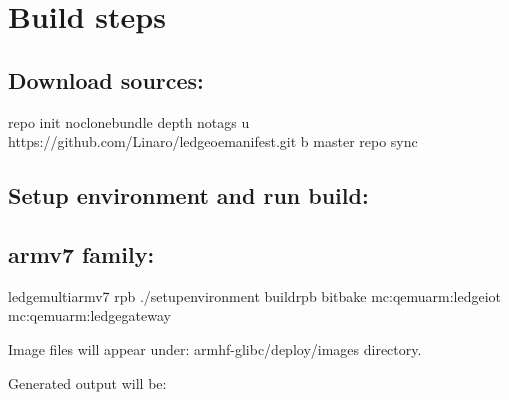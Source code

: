 \documentclass[a4paper,10pt,oneside,english]{sphinxmanual}
\begin{document}
\section{Build steps}
\label{\detokenize{chapter2-oe:build-steps}}

\subsection{Download sources:}
\label{\detokenize{chapter2-oe:download-sources}}
\begin{sphinxVerbatim}[commandchars=\\\{\}]
repo init \PYGZhy{}\PYGZhy{}no\PYGZhy{}clone\PYGZhy{}bundle \PYGZhy{}\PYGZhy{}depth \PYGZhy{}\PYGZhy{}no\PYGZhy{}tags \PYGZhy{}u https://github.com/Linaro/ledge\PYGZhy{}oe\PYGZhy{}manifest.git \PYGZhy{}b master
repo sync
\end{sphinxVerbatim}


\subsection{Setup environment and run build:}
\label{\detokenize{chapter2-oe:setup-environment-and-run-build}}

\subsection{armv7 family:}
\label{\detokenize{chapter2-oe:armv7-family}}
\begin{sphinxVerbatim}[commandchars=\\\{\}]
ledge\PYGZhy{}multi\PYGZhy{}armv7 rpb  ./setup\PYGZhy{}environment build\PYGZhy{}rpb
bitbake mc:qemuarm:ledge\PYGZhy{}iot mc:qemuarm:ledge\PYGZhy{}gateway 
\end{sphinxVerbatim}

Image files will appear under: armhf-glibc/deploy/images directory.

Generated output will be:
\end{document}

